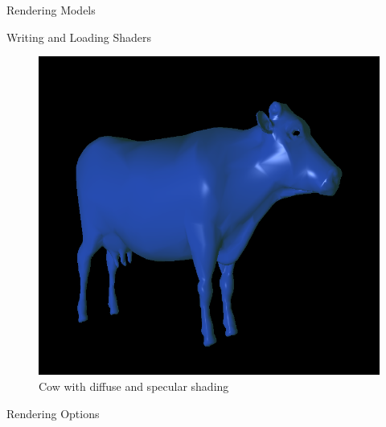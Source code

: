 \documentclass{article}
\begin{document}
\begin{multicols}{2}
\begin{section}{Rendering Models}
\begin{subsection}{Writing and Loading Shaders}
  \begin{figure}[H]
    \centering
    \includegraphics[width=0.9\linewidth]{./res/shaded_cow.png}
    \caption{Cow with diffuse and specular shading}
    \label{fig:shaded-cow}
  \end{figure}
    
  \end{subsection}

  \begin{subsection}{Rendering Options}
    \label{sec:render-opt}


\end{subsection}
\end{section}
\end{multicols}
\end{document}
